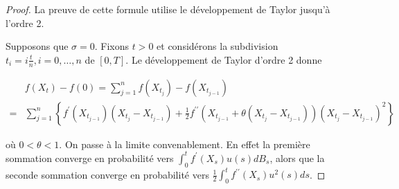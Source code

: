 \documentclass[A4paper,12pt]{report}
\begin{document}
\begin{proof}
La preuve de cette formule utilise le développement de Taylor jusqu'à l'ordre 2.

Supposons que $\sigma = 0$. Fixons $t>0$ et considérons la subdivision $t_{i}=i \frac{t}{n}, i=0, \ldots, n$ de $[0, T]$. Le développement de Taylor d'ordre 2 donne

$$
\begin{aligned}
& f\left(X_{t}\right)-f(0)=\sum_{j=1}^{n} f\left(X_{t_{j}}\right)-f\left(X_{t_{j-1}}\right) \\
= & \sum_{j=1}^{n}\left\{f^{\prime}\left(X_{t_{j-1}}\right)\left(X_{t_{j}}-X_{t_{j-1}}\right)+\frac{1}{2} f^{\prime \prime}\left(X_{t_{j-1}}+\theta\left(X_{t_{j}}-X_{t_{j-1}}\right)\right)\left(X_{t_{j}}-X_{t_{j-1}}\right)^{2}\right\}
\end{aligned}
$$

où $0<\theta<1$. On passe à la limite convenablement. En effet la première sommation converge en probabilité vers $\int_{0}^{t} f^{\prime}\left(X_{s}\right) u(s) d B_{s}$, alors que la seconde sommation converge en probabilité vers $\frac{1}{2} \int_{0}^{t} f^{\prime \prime}\left(X_{s}\right) u^{2}(s) d s$.
\end{proof}
\end{document}
